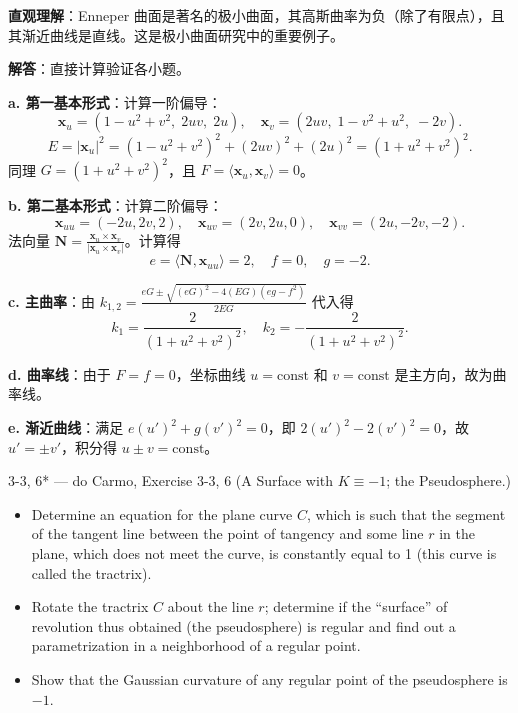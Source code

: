 \begin{solution}
\textbf{直观理解}：Enneper 曲面是著名的极小曲面，其高斯曲率为负（除了有限点），且其渐近曲线是直线。这是极小曲面研究中的重要例子。

\textbf{解答}：直接计算验证各小题。

\textbf{a. 第一基本形式}：计算一阶偏导：
\[
\mathbf{x}_u = (1 - u^2 + v^2,\; 2uv,\; 2u),\quad
\mathbf{x}_v = (2uv,\; 1 - v^2 + u^2,\; -2v).
\]
\[
E = |\mathbf{x}_u|^2 = (1-u^2+v^2)^2 + (2uv)^2 + (2u)^2 = (1+u^2+v^2)^2.
\]
同理 $G = (1+u^2+v^2)^2$，且 $F = \langle \mathbf{x}_u, \mathbf{x}_v \rangle = 0$。

\textbf{b. 第二基本形式}：计算二阶偏导：
\[
\mathbf{x}_{uu} = (-2u, 2v, 2),\quad \mathbf{x}_{uv} = (2v, 2u, 0),\quad \mathbf{x}_{vv} = (2u, -2v, -2).
\]
法向量 $\mathbf{N} = \frac{\mathbf{x}_u \times \mathbf{x}_v}{|\mathbf{x}_u \times \mathbf{x}_v|}$。计算得
\[
e = \langle \mathbf{N}, \mathbf{x}_{uu} \rangle = 2,\quad f = 0,\quad g = -2.
\]

\textbf{c. 主曲率}：由 $k_{1,2} = \frac{eG \pm \sqrt{(eG)^2 - 4(EG)(eg-f^2)}}{2EG}$ 代入得
\[
k_1 = \frac{2}{(1+u^2+v^2)^2},\quad k_2 = -\frac{2}{(1+u^2+v^2)^2}.
\]

\textbf{d. 曲率线}：由于 $F = f = 0$，坐标曲线 $u = \mathrm{const}$ 和 $v = \mathrm{const}$ 是主方向，故为曲率线。

\textbf{e. 渐近曲线}：满足 $e(u')^2 + g(v')^2 = 0$，即 $2(u')^2 - 2(v')^2 = 0$，故 $u' = \pm v'$，积分得 $u \pm v = \mathrm{const}$。
\end{solution}

\begin{exercise}{3-3, 6* — do Carmo, Exercise 3-3, 6}
(A Surface with $K \equiv -1$; the Pseudosphere.)
\begin{itemize}
\item[a.] Determine an equation for the plane curve $C$, which is such that the segment of the tangent line between the point of tangency and some line $r$ in the plane, which does not meet the curve, is constantly equal to 1 (this curve is called the tractrix).
\item[b.] Rotate the tractrix $C$ about the line $r$; determine if the ``surface'' of revolution thus obtained (the pseudosphere) is regular and find out a parametrization in a neighborhood of a regular point.
\item[c.] Show that the Gaussian curvature of any regular point of the pseudosphere is $-1$.
\end{itemize}
\end{exercise}

